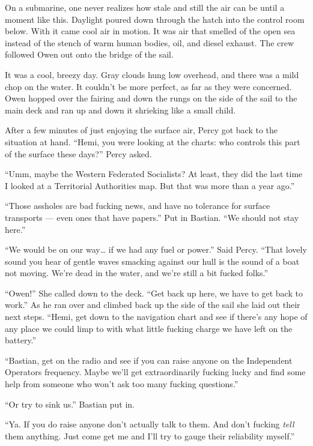 \documentclass[]{scrbook}
\begin{document}
On a submarine, one never realizes how stale and still the air can be
until a moment like this. Daylight poured down through the hatch into
the control room below. With it came cool air in motion. It was air that
smelled of the open sea instead of the stench of warm human bodies, oil,
and diesel exhaust. The crew followed Owen out onto the bridge of the
sail.

It was a cool, breezy day. Gray clouds hung low overhead, and there was
a mild chop on the water. It couldn't be more perfect, as far as they
were concerned. Owen hopped over the fairing and down the rungs on the
side of the sail to the main deck and ran up and down it shrieking like
a small child.

After a few minutes of just enjoying the surface air, Percy got back to
the situation at hand. ``Hemi, you were looking at the charts: who
controls this part of the surface these days?'' Percy asked.

``Umm, maybe the Western Federated Socialists? At least, they did the
last time I looked at a Territorial Authorities map. But that was more
than a year ago.''

``Those assholes are bad fucking news, and have no tolerance for surface
transports --- even ones that have papers.'' Put in Bastian. ``We should
not stay here.''

``We would be on our way\ldots{} if we had any fuel or power.'' Said
Percy. ``That lovely sound you hear of gentle waves smacking against our
hull is the sound of a boat not moving. We're dead in the water, and
we're still a bit fucked folks.''

``Owen!'' She called down to the deck. ``Get back up here, we have to
get back to work.'' As he ran over and climbed back up the side of the
sail she laid out their next steps. ``Hemi, get down to the navigation
chart and see if there's any hope of any place we could limp to with
what little fucking charge we have left on the battery.''

``Bastian, get on the radio and see if you can raise anyone on the
Independent Operators frequency. Maybe we'll get extraordinarily fucking
lucky and find some help from someone who won't ask too many fucking
questions.''

``Or try to sink us.'' Bastian put in.

``Ya. If you do raise anyone don't actually talk to them. And don't
fucking \emph{tell} them anything. Just come get me and I'll try to
gauge their reliability myself.''
\end{document}
